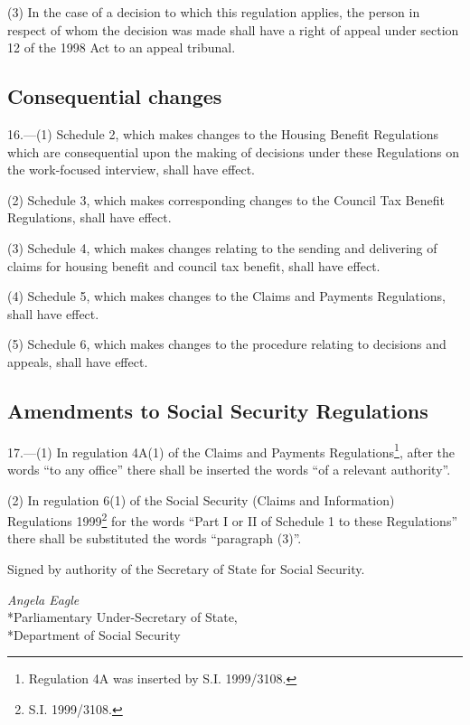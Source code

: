 \documentclass[12pt,a4paper]{article}
\begin{document}
(3) In the case of a decision to which this regulation applies, the person in respect of whom the decision was made shall have a right of appeal under section 12 of the 1998 Act to an appeal tribunal.

\subsection[16. Consequential changes]{Consequential changes}

16.---(1)  Schedule 2, which makes changes to the Housing Benefit Regulations which are consequential upon the making of decisions under these Regulations on the work-focused interview, shall have effect.

(2) Schedule 3, which makes corresponding changes to the Council Tax Benefit Regulations, shall have effect.

(3) Schedule 4, which makes changes relating to the sending and delivering of claims for housing benefit and council tax benefit, shall have effect.

(4) Schedule 5, which makes changes to the Claims and Payments Regulations, shall have effect.

(5) Schedule 6, which makes changes to the procedure relating to decisions and appeals, shall have effect.

\subsection[17. Amendments to Social Security Regulations]{Amendments to Social Security Regulations}

17.---(1)  In regulation 4A(1) of the Claims and Payments Regulations\footnote{\frenchspacing Regulation 4A was inserted by S.I. 1999/3108.}, after the words “to any office” there shall be inserted the words “of a relevant authority”.

(2) In regulation 6(1) of the Social Security (Claims and Information) Regulations 1999\footnote{\frenchspacing S.I. 1999/3108.} for the words “Part I or II of Schedule 1 to these Regulations” there shall be substituted the words “paragraph (3)”. 

\bigskip

Signed 
by authority of the Secretary of State for Social Security.

{\raggedleft
\emph{Angela Eagle
}\\*Parliamentary Under-Secretary of State,\\*Department of Social Security

}
\end{document}
